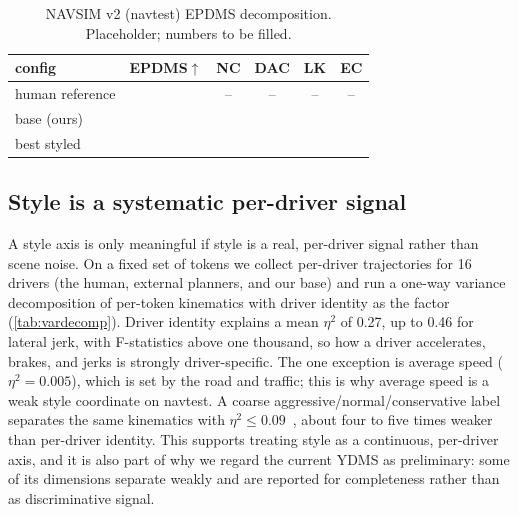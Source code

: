 \begin{table}[t]
    \centering
    \small
    \setlength{\tabcolsep}{4pt}
    \begin{tabular}{lccccc}
        \toprule
        config & EPDMS$\uparrow$ & NC & DAC & LK & EC \\
        \midrule
        human reference & \TODO{} & -- & -- & -- & -- \\
        base (ours)     & \TODO{} & \TODO{} & \TODO{} & \TODO{} & \TODO{} \\
        best styled     & \TODO{} & \TODO{} & \TODO{} & \TODO{} & \TODO{} \\
        \bottomrule
    \end{tabular}
    \caption{NAVSIM v2 (navtest) EPDMS decomposition. Placeholder; numbers to be
    filled.}
    \label{tab:v2}
\end{table}

\subsection{Style is a systematic per-driver signal}
\label{sec:exp:systematic}
A style axis is only meaningful if style is a real, per-driver signal rather than
scene noise. On a fixed set of tokens we collect per-driver trajectories for 16
drivers (the human, external planners, and our base) and run a one-way variance
decomposition of per-token kinematics with driver identity as the factor
(\cref{tab:vardecomp}). Driver identity explains a mean $\eta^2$ of 0.27, up to 0.46
for lateral jerk, with F-statistics above one thousand, so how a driver accelerates,
brakes, and jerks is strongly driver-specific. The one exception is average speed
($\eta^2{=}0.005$), which is set by the road and traffic; this is why average speed
is a weak style coordinate on navtest. A coarse aggressive/normal/conservative label
separates the same kinematics with $\eta^2 \le 0.09$~\cite{styledrive}, about four to
five times weaker than per-driver identity. This supports treating style as a
continuous, per-driver axis, and it is also part of why we regard the current YDMS as
preliminary: some of its dimensions separate weakly and are reported for
completeness rather than as discriminative signal.

